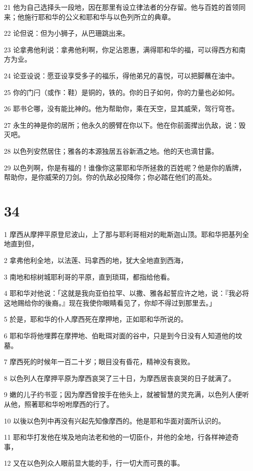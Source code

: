 \par 21 他为自己选择头一段地，因在那里有设立律法者的分存留。他与百姓的首领同来；他施行耶和华的公义和耶和华与以色列所立的典章。
\par 22 论但说：但为小狮子，从巴珊跳出来。
\par 23 论拿弗他利说：拿弗他利啊，你足沾恩惠，满得耶和华的福，可以得西方和南方为业。
\par 24 论亚设说：愿亚设享受多子的福乐，得他弟兄的喜悦，可以把脚蘸在油中。
\par 25 你的门闩（或作：鞋）是铜的，铁的。你的日子如何，你的力量也必如何。
\par 26 耶书仑哪，没有能比神的。他为帮助你，乘在天空，显其威荣，驾行穹苍。
\par 27 永生的神是你的居所；他永久的膀臂在你以下。他在你前面撵出仇敌，说：毁灭吧。
\par 28 以色列安然居住；雅各的本源独居五谷新酒之地。他的天也滴甘露。
\par 29 以色列啊，你是有福的！谁像你这蒙耶和华所拯救的百姓呢？他是你的盾牌，帮助你，是你威荣的刀剑。你的仇敌必投降你；你必踏在他们的高处。

\chapter{34}

\par 1 摩西从摩押平原登尼波山，上了那与耶利哥相对的毗斯迦山顶。耶和华把基列全地直到但，
\par 2 拿弗他利全地，以法莲、玛拿西的地，犹大全地直到西海，
\par 3 南地和棕树城耶利哥的平原，直到琐珥，都指给他看。
\par 4 耶和华对他说：「这就是我向亚伯拉罕、以撒、雅各起誓应许之地，说：『我必将这地赐给你的後裔。』现在我使你眼睛看见了，你却不得过到那里去。」
\par 5 於是，耶和华的仆人摩西死在摩押地，正如耶和华所说的。
\par 6 耶和华将他埋葬在摩押地、伯毗珥对面的谷中，只是到今日没有人知道他的坟墓。
\par 7 摩西死的时候年一百二十岁；眼目没有昏花，精神没有衰败。
\par 8 以色列人在摩押平原为摩西哀哭了三十日，为摩西居丧哀哭的日子就满了。
\par 9 嫩的儿子约书亚；因为摩西曾按手在他头上，就被智慧的灵充满，以色列人便听从他，照著耶和华吩咐摩西的行了。
\par 10 以後以色列中再没有兴起先知像摩西的。他是耶和华面对面所认识的。
\par 11 耶和华打发他在埃及地向法老和他的一切臣仆，并他的全地，行各样神迹奇事，
\par 12 又在以色列众人眼前显大能的手，行一切大而可畏的事。


